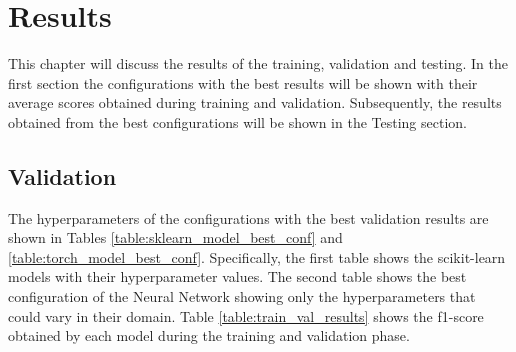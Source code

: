 \documentclass[../main]{subfiles}
\begin{document}
\chapter{Results}
This chapter will discuss the results of the training, validation and testing.
In the first section the configurations with the best results will be shown with their average scores obtained during training and validation.
Subsequently, the results obtained from the best configurations will be shown in the Testing section. 

\section{Validation}
The hyperparameters of the configurations with the best validation results are shown in Tables \ref{table:sklearn_model_best_conf} and \ref{table:torch_model_best_conf}.
Specifically, the first table shows the scikit-learn models with their hyperparameter values.
The second table shows the best configuration of the Neural Network showing only the hyperparameters that could vary in their domain.
Table \ref{table:train_val_results} shows the f1-score obtained by each model during the training and validation phase.
\end{document}
